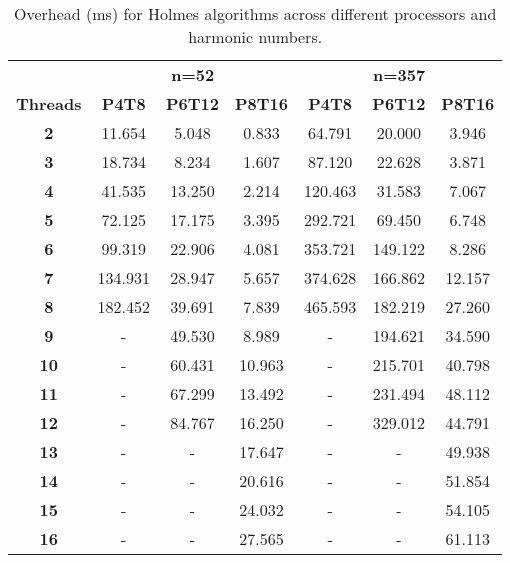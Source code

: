 
\begin{table*}[ht]
\centering
\caption{Overhead (ms) for Holmes algorithms across different processors and harmonic numbers.}
\label{tab:overhead_metrics}
\begin{tabular}{c|ccc|ccc}
\hline
 & \multicolumn{3}{c}{\textbf{n=52}}  & \multicolumn{3}{c}{\textbf{n=357}}  \\
\cline{2-7}
{\textbf{Threads}}
& \textbf{P4T8} & \textbf{P6T12} & \textbf{P8T16} & \textbf{P4T8} & \textbf{P6T12} & \textbf{P8T16} \\
\hline
\textbf{2} & 11.654 & 5.048 & 0.833 & 64.791 & 20.000 & 3.946 \\ \hline
\textbf{3} & 18.734 & 8.234 & 1.607 & 87.120 & 22.628 & 3.871 \\ \hline
\textbf{4} & 41.535 & 13.250 & 2.214 & 120.463 & 31.583 & 7.067 \\ \hline
\textbf{5} & 72.125 & 17.175 & 3.395 & 292.721 & 69.450 & 6.748 \\ \hline
\textbf{6} & 99.319 & 22.906 & 4.081 & 353.721 & 149.122 & 8.286 \\ \hline
\textbf{7} & 134.931 & 28.947 & 5.657 & 374.628 & 166.862 & 12.157 \\ \hline
\textbf{8} & 182.452 & 39.691 & 7.839 & 465.593 & 182.219 & 27.260 \\ \hline
\textbf{9} & - & 49.530 & 8.989 & - & 194.621 & 34.590 \\ \hline
\textbf{10} & - & 60.431 & 10.963 & - & 215.701 & 40.798 \\ \hline
\textbf{11} & - & 67.299 & 13.492 & - & 231.494 & 48.112 \\ \hline
\textbf{12} & - & 84.767 & 16.250 & - & 329.012 & 44.791 \\ \hline
\textbf{13} & - & - & 17.647 & - & - & 49.938 \\ \hline
\textbf{14} & - & - & 20.616 & - & - & 51.854 \\ \hline
\textbf{15} & - & - & 24.032 & - & - & 54.105 \\ \hline
\textbf{16} & - & - & 27.565 & - & - & 61.113 \\ \hline

\end{tabular}
\end{table*}
